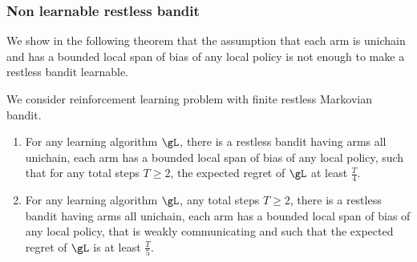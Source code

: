 \subsubsection{Non learnable restless bandit}

We show in the following theorem that the assumption that each arm is unichain and has a bounded local span of bias of any local policy is not enough to make a restless bandit learnable.

\begin{thm}
    \label{thm:non_learnable}
    We consider reinforcement learning problem with finite restless Markovian bandit.
    \begin{enumerate}[label=(\roman*)]
        \item \label{it:non_learnable1} For any learning algorithm $\gL$, there is a restless bandit having arms all unichain, each arm has a bounded local span of bias of any local policy, such that for any total steps $T\ge2$, the expected regret of $\gL$ at least $\frac{T}4$.
        \item \label{it:non_learnable2} For any learning algorithm $\gL$, any total steps $T\ge2$, there is a restless bandit having arms all unichain, each arm has a bounded local span of bias of any local policy, that is weakly communicating and such that the expected regret of $\gL$ is at least $\frac{T}5$.
    \end{enumerate}
\end{thm}
